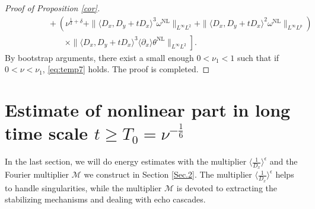 \documentclass[reqno, 12pt]{amsart} %
\theoremstyle{plain} %
\theoremstyle{definition}
\theoremstyle{remark}
\numberwithin{equation}{section} %
\newcommand{\lt}{\left}
\newcommand{\rt}{\right}
\newcommand{\px}{\partial_x}
\begin{document}
\begin{proof}[Proof of Proposition \ref{cor}]
$$\begin{aligned}
			&\lt. \qquad \qquad + (   \nu^{\frac13 +\delta} + \|\langle D_x, D_y+t D_x\rangle^3 \omega^{\mathrm{NL}}\|_{L^\infty L^2} + \|\langle D_x, D_y+t D_x\rangle^2 \omega^{\mathrm{NL}}\|_{L^\infty L^p}  ) \rt. \\
			&\lt. \qquad \qquad \quad\quad \times \|\langle D_x, D_y+t D_x\rangle^3 \langle\px\rangle \theta^{\mathrm{NL}}\|_{L^\infty L^2}  \rt] .
		\end{aligned}
		$$
		By bootstrap arguments, there exist a small enough $0< \nu_1<1$ such that if $0<\nu<\nu_1$, \eqref{eq:temp7} holds. The proof is completed.
	\end{proof}
	
	
	
	
	\section{Estimate of nonlinear part in long time scale $t\geq  T_0 = \nu^{-\frac16}$} \label{sec.5}
	In the last section, we will do energy estimates with the multiplier $\langle\frac{1}{D_x}\rangle^\epsilon$ and the Fourier multiplier $\mathcal{M}$ we construct in Section \ref{Sec.2}. The multiplier $\langle\frac{1}{D_x}\rangle^\epsilon$ helps to handle singularities, while the multiplier $\mathcal{M}$ is devoted to extracting the stabilizing mechanisms and dealing with echo cascades.
	
\end{document}
